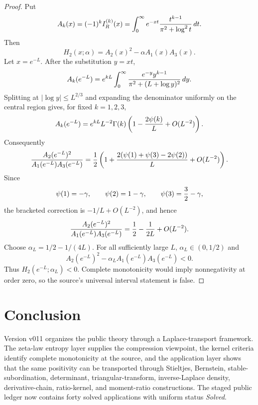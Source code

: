 \documentclass[11pt]{article}
\numberwithin{equation}{section}
\theoremstyle{definition}
\theoremstyle{remark}
\newcommand{\1}{\mathbf 1}
\begin{document}
\begin{proof}
Put
\[
 A_k(x)=(-1)^kI_R^{(k)}(x)
 =\int_0^\infty e^{-xt}{t^{k-1}\over \pi^2+\log^2t}\,dt .
\]
Then
\[
 H_2(x;\alpha)=A_2(x)^2-\alpha A_1(x)A_3(x).
\]
Let \(x=e^{-L}\).  After the substitution \(y=xt\),
\[
 A_k(e^{-L})
 =
 e^{kL}\int_0^\infty
 {e^{-y}y^{k-1}\over \pi^2+(L+\log y)^2}\,dy .
\]
Splitting at \(|\log y|\le L^{2/3}\) and expanding the denominator uniformly
on the central region gives, for fixed \(k=1,2,3\),
\[
 A_k(e^{-L})
 =
 e^{kL}L^{-2}\Gamma(k)
 \left(1-{2\psi(k)\over L}+O(L^{-2})\right).
\]
Consequently
\[
 {A_2(e^{-L})^2\over A_1(e^{-L})A_3(e^{-L})}
 =
 {1\over2}
 \left(
 1+{2(\psi(1)+\psi(3)-2\psi(2))\over L}+O(L^{-2})
 \right).
\]
Since
\[
 \psi(1)=-\gamma,\qquad
 \psi(2)=1-\gamma,\qquad
 \psi(3)={3\over2}-\gamma,
\]
the bracketed correction is \(-1/L+O(L^{-2})\), and hence
\[
 {A_2(e^{-L})^2\over A_1(e^{-L})A_3(e^{-L})}
 =
 {1\over2}-{1\over2L}+O(L^{-2}).
\]
Choose \(\alpha_L=1/2-1/(4L)\).  For all sufficiently large \(L\),
\(\alpha_L\in(0,1/2)\) and
\[
 A_2(e^{-L})^2-\alpha_L A_1(e^{-L})A_3(e^{-L})<0.
\]
Thus \(H_2(e^{-L};\alpha_L)<0\).  Complete monotonicity would imply
nonnegativity at order zero, so the source's universal interval statement is
false.
\end{proof}

\section{Conclusion}

Version v011 organizes the public theory through a Laplace-transport
framework.  The zeta-law entropy layer supplies the compression viewpoint, the
kernel criteria identify complete monotonicity at the source, and the
application layer shows that the same positivity can be transported through
Stieltjes, Bernstein, stable-subordination, determinant, triangular-transform,
inverse-Laplace density, derivative-chain, ratio-kernel, and moment-ratio
constructions.  The staged public ledger now contains forty solved
applications with uniform status \emph{Solved}.
\end{document}
